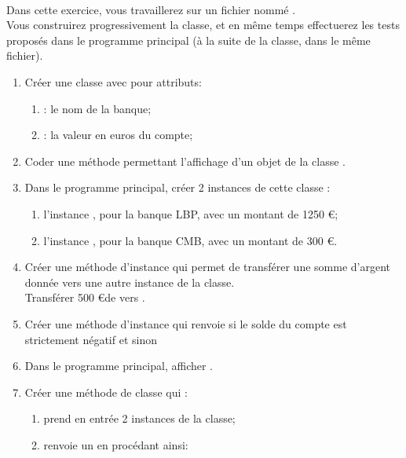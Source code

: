 \documentclass[a4paper,12pt]{article}
\begin{document}
\nouveaustyle
{}

\\

Dans cette exercice, vous travaillerez sur un fichier nommé .\\
Vous construirez progressivement la classe, et en même temps effectuerez les tests proposés dans le programme principal (à la suite de la classe, dans le même fichier).

\begin{enumerate}[\bfseries 1.]
	\item 	Créer une classe  avec pour attributs:
            \begin{enumerate}[--]
            	\item {} : le nom de la banque;
            	\item {} : la valeur en euros du compte;
            \end{enumerate}
	\item 	Coder une méthode permettant l'affichage d'un objet de la classe .
    \item 	Dans le programme principal, créer 2 instances de cette classe :
            \begin{enumerate}[--]
            	\item 	l'instance , pour la banque LBP, avec un montant de 1250 \euro;
            	\item 	l'instance , pour la banque CMB, avec un montant de 300 \euro.
            \end{enumerate}
    \item 	Créer une méthode d'instance  qui permet de transférer une somme d'argent donnée vers une autre instance de la classe.\\
            Transférer 500 \euro de  vers .
    \item 	Créer une méthode d'instance  qui renvoie  si le solde du compte est strictement négatif et  sinon
    \item 	Dans le programme principal, afficher .
    \item 	Créer une méthode de classe  qui :
            \begin{enumerate}[--]
            	\item 	prend en entrée 2 instances de la classe;
            	\item 	renvoie un  en procédant ainsi:

\end{enumerate}
\end{enumerate}
\end{document}
